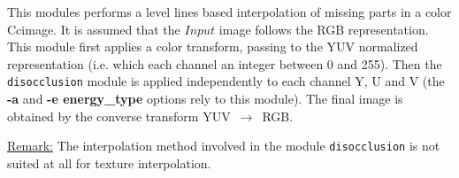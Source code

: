 This modules performs a level lines based interpolation of missing parts in a color Ccimage. It is assumed that the $Input$ image follows the RGB representation. This module first applies a color transform, passing to the YUV normalized representation (i.e. which each channel an integer between 0 and 255). Then the \verb+disocclusion+ module is applied independently to each channel Y, U and V (the {\bf -a} and {\bf -e energy\_type} options rely to this module). The final image is obtained by the converse transform YUV~$\to$~RGB.

\medskip
\underline{Remark:} The interpolation method involved in the module \verb+disocclusion+ is not suited at all for texture interpolation.
